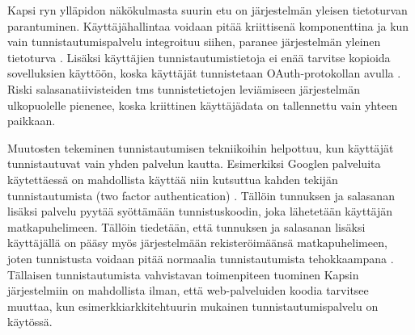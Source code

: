 Kapsi ryn ylläpidon näkökulmasta suurin etu on järjestelmän yleisen tietoturvan parantuminen. Käyttäjähallintaa voidaan pitää kriittisenä komponenttina ja kun vain tunnistautumispalvelu integroituu siihen, paranee järjestelmän yleinen tietoturva \cite{arkkitehtuurit}. Lisäksi käyttäjien tunnistautumistietoja ei enää tarvitse kopioida sovelluksien käyttöön, koska käyttäjät tunnistetaan OAuth-protokollan avulla \cite{oauth2_0}. Riski salasanatiivisteiden tms tunnistetietojen leviämiseen järjestelmän ulkopuolelle pienenee, koska kriittinen käyttäjädata on tallennettu vain yhteen paikkaan.

Muutosten tekeminen tunnistautumisen tekniikoihin helpottuu, kun käyttäjät tunnistautuvat vain yhden palvelun kautta. Esimerkiksi Googlen palveluita käytettäessä on mahdollista käyttää niin kutsuttua kahden tekijän tunnistautumista (two factor authentication) \cite{google_two_factor}. Tällöin tunnuksen ja salasanan lisäksi palvelu pyytää syöttämään tunnistuskoodin, joka lähetetään käyttäjän matkapuhelimeen. Tällöin tiedetään, että tunnuksen ja salasanan lisäksi käyttäjällä on pääsy myös järjestelmään rekisteröimäänsä matkapuhelimeen, joten tunnistusta voidaan pitää normaalia tunnistautumista tehokkaampana \cite{}. Tällaisen tunnistautumista vahvistavan toimenpiteen tuominen Kapsin järjestelmiin on mahdollista ilman, että web-palveluiden koodia tarvitsee muuttaa, kun esimerkkiarkkitehtuurin mukainen tunnistautumispalvelu on käytössä.